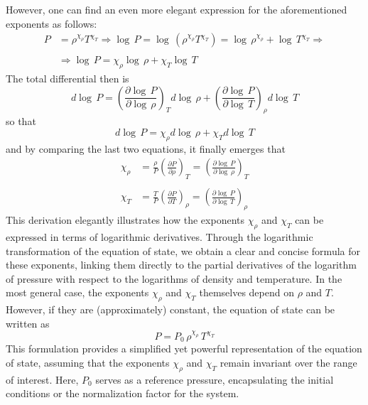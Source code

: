 \documentclass[main.tex]{subfiles}
\begin{document}
However, one can find an even more elegant expression for the aforementioned exponents as follows:
\begin{align*}
     P &= \rho^{\chi_\rho} T^{\chi_T} \Rightarrow \log \,P = \log \,\left( \rho^{\chi_\rho} T^{\chi_T} \right) = \log \,\rho^{\chi_\rho} + \log \,T^{\chi_T} \Rightarrow \\\\
     &\Rightarrow \log \,P = \chi_\rho \log \,\rho + \chi_T \log \,T
\end{align*}
The total differential then is
\begin{equation*}
    d\log \,P = \left( \frac{\partial \log \,P}{\partial \log \,\rho} \right)_T d \log \,\rho + \left( \frac{\partial \log \,P}{\partial \log \,T} \right)_\rho d \log \,T
\end{equation*}
so that
\begin{equation*}
    d \log \,P = \chi_\rho d\log \,\rho + \chi_T d \log \,T
\end{equation*}
and by comparing the last two equations, it finally emerges that
\begin{align}
    \chi_\rho &= \frac{\rho}{P} \left( \frac{\partial P}{\partial \rho} \right)_T = \left( \frac{\partial \log \,P}{\partial \log \,\rho} \right)_T \label{apx:eq:chi_rho}\\\nonumber\\
    \chi_T &= \frac{T}{P} \left( \frac{\partial P}{\partial T} \right)_\rho = \left( \frac{\partial \log \,P}{\partial \log \,T} \right)_\rho \label{apx:eq:chi_T}
\end{align}
This derivation elegantly illustrates how the exponents $\chi_\rho$ and $\chi_T$ can be expressed in terms of logarithmic derivatives. Through the logarithmic transformation of the equation of state, we obtain a clear and concise formula for these exponents, linking them directly to the partial derivatives of the logarithm of pressure with respect to the logarithms of density and temperature. 
In the most general case, the exponents $\chi_\rho$ and $\chi_T$ themselves depend on $\rho$ and $T$. However, if they are (approximately) constant, the equation of state can be written as
\begin{equation}
    \label{apx:eq:eos_chi_rho_chi_T}
    P = P_0 \,\rho^{\chi_\rho} \,T^{\chi_T}
\end{equation}
This formulation provides a simplified yet powerful representation of the equation of state, assuming that the exponents $\chi_\rho$ and $\chi_T$ remain invariant over the range of interest. Here, $P_0$ serves as a reference pressure, encapsulating the initial conditions or the normalization factor for the system.
\end{document}
